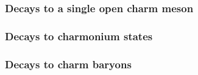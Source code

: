 \subsubsection{Decays to a single open charm meson}

\subsubsection{Decays to charmonium states}

\subsubsection{Decays to charm baryons}
